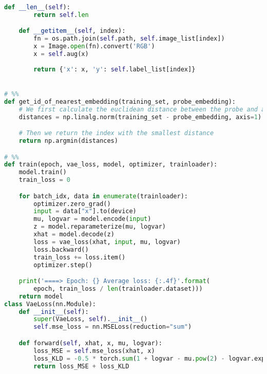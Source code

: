 \documentclass{article}
\begin{document}
\begin{lstlisting}[language=Python]
    def __len__(self):
        return self.len

    def __getitem__(self, index):
        fn = os.path.join(self.path, self.image_list[index])
        x = Image.open(fn).convert('RGB')
        x = self.aug(x)
        
        return {'x': x, 'y': self.label_list[index]}


# %%
def get_id_of_nearest_embedding(training_set, probe_embedding):
    # We first calculate the euclidean distance between the probe and all trained embeddings:
    distances = np.linalg.norm(training_set - probe_embedding, axis=1)

    # Then we return the index with the smallest distance
    return np.argmin(distances)

# %%
def train(epoch, vae_loss, model, optimizer, trainloader):
    model.train()
    train_loss = 0

    for batch_idx, data in enumerate(trainloader):
        optimizer.zero_grad()
        input = data["x"].to(device)
        mu, logvar = model.encode(input)
        z = model.reparameterize(mu, logvar)
        xhat = model.decode(z)
        loss = vae_loss(xhat, input, mu, logvar)
        loss.backward()
        train_loss += loss.item()
        optimizer.step()

    print('====> Epoch: {} Average loss: {:.4f}'.format(
        epoch, train_loss / len(trainloader.dataset)))
    return model
class VaeLoss(nn.Module):
    def __init__(self):
        super(VaeLoss, self).__init__()
        self.mse_loss = nn.MSELoss(reduction="sum")

    def forward(self, xhat, x, mu, logvar):
        loss_MSE = self.mse_loss(xhat, x)
        loss_KLD = -0.5 * torch.sum(1 + logvar - mu.pow(2) - logvar.exp())
        return loss_MSE + loss_KLD


\end{lstlisting}
\end{document}
